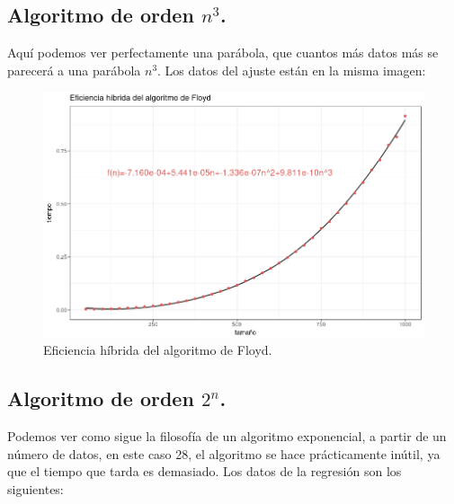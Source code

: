 \documentclass[a4paper, 11pt]{article}
\begin{document}
\pagebreak
\subsection{Algoritmo de orden $n^3$.}

Aquí podemos ver perfectamente una parábola, que cuantos más datos más se parecerá a una parábola $n^3$. Los datos del ajuste están en la misma imagen:
\begin{figure}[!hbp]
	\includegraphics[width=\textwidth]{floyd_hibrido_formula.png}
	\caption{Eficiencia híbrida del algoritmo de Floyd.\label{ffloyd}}
\end{figure}
\pagebreak
\subsection{Algoritmo de orden $2^n$.}
	 Podemos ver como sigue la filosofía de un algoritmo exponencial, a partir de un número de datos, en este caso 28, el algoritmo se hace prácticamente inútil, ya que el tiempo que tarda es demasiado. Los datos de la regresión son los siguientes:
\end{document}
